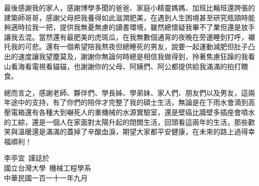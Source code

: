 \begin{acknowledgementsCH}
最後感謝我的家人，感謝博學多聞的爸爸、家庭小精靈媽媽、加班比輪班還誇張的建築師哥哥，感謝父母把我養得如此滋潤肥美，在遇到人生困境甚至研究瓶頸時能夠適時拉我一把，提供我無憂無慮的讀書環境，雖然總懷疑我畢不了業但還是放手讓我去混。當然還有最肥美的虎斑瓜，在我無數個通宵的夜晚在旁邊睡到打呼，襯托我的可悲。還有一個希望陪我熬夜但總睡死的男友，說要一起運動減肥但肚子凸出的速度讓我望塵莫及，謝謝你無論何時總是相信我做得到，拎著焦慮狂躁的我看山看海看電視看貓貓，也謝謝你的父母、阿姨們、阿公都提供給我滿滿的拍打餵食。

總而言之，感謝老師、夥伴們、學長姊、學弟妹、家人們、朋友們以及男友，這兩年途中的支持，有了你們的陪伴才完整了我的碩士生活，無論是在下雨水會滴到高壓電箱還有各種大到嚇死人的重機械的水源實驗室，還是壁癌比牆壁多插座會噴水的工綜，還是一個人在家面對太陽升起的閉關生活，回頭看這兩年的生活，那些歡笑與溫暖還是滿滿的蓋掉了辛酸血淚，期望大家都平安健康，在未來的路上過得幸福順利！

\begin{flushright}
    李亭宜\  謹誌於\\
    國立台灣大學\  機械工程學系\\
    中華民國一百一十一年九月
 \end{flushright}


 \end{acknowledgementsCH}